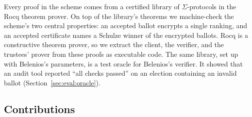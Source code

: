 Every proof in the scheme comes from a certified library of
$\Sigma$-protocols in the Rocq theorem prover. On top of the library's
theorems we machine-check the scheme's two central properties: an
accepted ballot encrypts a single ranking, and an accepted certificate
names a Schulze winner of the encrypted ballots. Rocq is a constructive
theorem prover, so we extract the client, the verifier, and the trustees'
prover from these proofs as executable code. The same library, set up
with Belenios's parameters, is a test oracle for Belenios's verifier. It
showed that an audit tool reported ``all checks passed'' on an election
containing an invalid ballot (Section~\ref{sec:eval:oracle}).

\subsection{Contributions}
